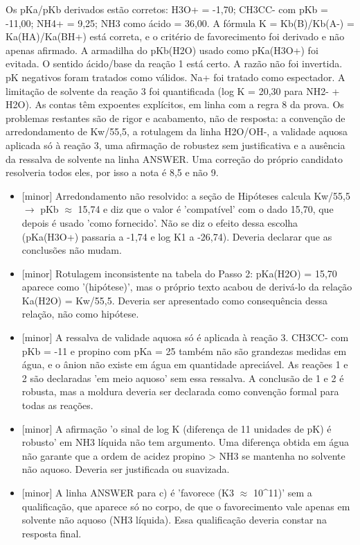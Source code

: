\documentclass{article}%
\begin{document}
Os pKa/pKb derivados estão corretos: H3O+ = -1,70; CH3CC- com pKb = -11,00; NH4+ = 9,25; NH3 como ácido = 36,00. A fórmula K = Kb(B)/Kb(A-) = Ka(HA)/Ka(BH+) está correta, e o critério de favorecimento foi derivado e não apenas afirmado. A armadilha do pKb(H2O) usado como pKa(H3O+) foi evitada. O sentido ácido/base da reação 1 está certo. A razão não foi invertida. pK negativos foram tratados como válidos. Na+ foi tratado como espectador. A limitação de solvente da reação 3 foi quantificada (log K = 20,30 para NH2- + H2O). As contas têm expoentes explícitos, em linha com a regra 8 da prova.\newline%
\newline%
Os problemas restantes são de rigor e acabamento, não de resposta: a convenção de arredondamento de Kw/55,5, a rotulagem da linha H2O/OH-, a validade aquosa aplicada só à reação 3, uma afirmação de robustez sem justificativa e a ausência da ressalva de solvente na linha ANSWER. Uma correção do próprio candidato resolveria todos eles, por isso a nota é 8,5 e não 9.%
\begin{itemize}%
\item%
{[}minor{]} Arredondamento não resolvido: a seção de Hipóteses calcula Kw/55,5 $\to$ pKb $\approx$ 15,74 e diz que o valor é 'compatível' com o dado 15,70, que depois é usado 'como fornecido'. Não se diz o efeito dessa escolha (pKa(H3O+) passaria a -1,74 e log K1 a -26,74). Deveria declarar que as conclusões não mudam.%
\item%
{[}minor{]} Rotulagem inconsistente na tabela do Passo 2: pKa(H2O) = 15,70 aparece como '(hipótese)', mas o próprio texto acabou de derivá{-}lo da relação Ka(H2O) = Kw/55,5. Deveria ser apresentado como consequência dessa relação, não como hipótese.%
\item%
{[}minor{]} A ressalva de validade aquosa só é aplicada à reação 3. CH3CC- com pKb = -11 e propino com pKa = 25 também não são grandezas medidas em água, e o ânion não existe em água em quantidade apreciável. As reações 1 e 2 são declaradas 'em meio aquoso' sem essa ressalva. A conclusão de 1 e 2 é robusta, mas a moldura deveria ser declarada como convenção formal para todas as reações.%
\item%
{[}minor{]} A afirmação 'o sinal de log K (diferença de 11 unidades de pK) é robusto' em NH3 líquida não tem argumento. Uma diferença obtida em água não garante que a ordem de acidez propino > NH3 se mantenha no solvente não aquoso. Deveria ser justificada ou suavizada.%
\item%
{[}minor{]} A linha ANSWER para c) é 'favorece (K3 $\approx$ 10\^{}11)' sem a qualificação, que aparece só no corpo, de que o favorecimento vale apenas em solvente não aquoso (NH3 líquida). Essa qualificação deveria constar na resposta final.%
\end{itemize}%
\end{document}
